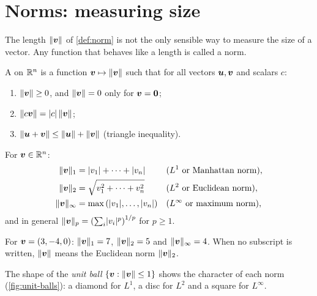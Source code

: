 \section{Norms: measuring size}\label{sec:norms}

The length $\lVert\bm{v}\rVert$ of \cref{def:norm} is not the only sensible way to
measure the size of a vector. Any function that behaves like a length is
called a norm.

\begin{definition}[Norm]\label{def:general-norm}
A  on $\mathbb{R}^n$ is a function $\bm{v} \mapsto \lVert\bm{v}\rVert$ such that for all
vectors $\bm{u}, \bm{v}$ and scalars $c$:
\begin{enumerate}
  \item $\lVert\bm{v}\rVert \ge 0$, and $\lVert\bm{v}\rVert = 0$ only for $\bm{v} = \bm{0}$;
  \item $\lVert c\bm{v}\rVert = \lvert c\rvert\,\lVert\bm{v}\rVert$;
  \item $\lVert\bm{u} + \bm{v}\rVert \le \lVert\bm{u}\rVert + \lVert\bm{v}\rVert$ (triangle inequality).
\end{enumerate}
\end{definition}

\begin{definition}\label{def:lp-norms}
For $\bm{v} \in \mathbb{R}^n$:
\begin{align*}
  \lVert\bm{v}\rVert_1 &= \lvert v_1\rvert + \dots + \lvert v_n\rvert
    && \text{($L^1$ or Manhattan norm)},\\
  \lVert\bm{v}\rVert_2 &= \sqrt{v_1^2 + \dots + v_n^2}
    && \text{($L^2$ or Euclidean norm)},\\
  \lVert\bm{v}\rVert_\infty &= \max\left(\lvert v_1\rvert, \dots, \lvert v_n\rvert\right)
    && \text{($L^\infty$ or maximum norm)},
\end{align*}
and in general $\lVert\bm{v}\rVert_p = \left(\sum_i \lvert v_i\rvert^p\right)^{1/p}$ for
$p \ge 1$.
\end{definition}

For $\bm{v} = (3, -4, 0)$: $\lVert\bm{v}\rVert_1 = 7$, $\lVert\bm{v}\rVert_2 = 5$ and
$\lVert\bm{v}\rVert_\infty = 4$. When no subscript is written, $\lVert\bm{v}\rVert$ means the
Euclidean norm $\lVert\bm{v}\rVert_2$.

The shape of the \emph{unit ball} $\{\bm{v} : \lVert\bm{v}\rVert \le 1\}$ shows the
character of each norm (\cref{fig:unit-balls}): a diamond for $L^1$, a disc for
$L^2$ and a square for $L^\infty$.

